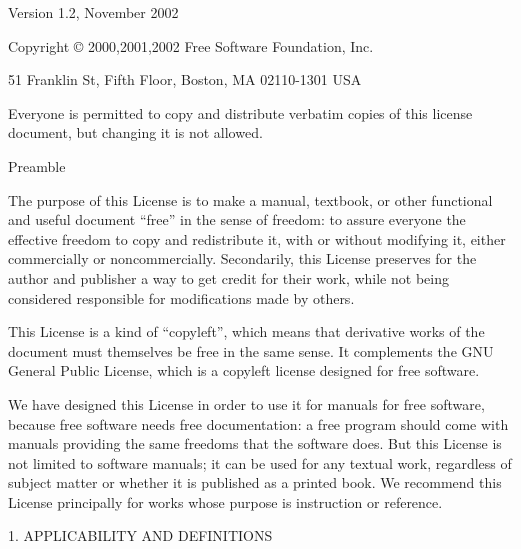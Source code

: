 \documentclass[10pt,a4paper,final]{book}
\begin{document}
{\small


 \begin{center}

       Version 1.2, November 2002


 Copyright \copyright{} 2000,2001,2002  Free Software Foundation, Inc.
 
 \bigskip
 
     51 Franklin St, Fifth Floor, Boston, MA  02110-1301  USA
  
 \bigskip
 
 Everyone is permitted to copy and distribute verbatim copies
 of this license document, but changing it is not allowed.
\end{center}


\begin{center}

{\Large Preamble\par}

\end{center}

The purpose of this License is to make a manual, textbook, or other
functional and useful document ``free'' in the sense of freedom: to
assure everyone the effective freedom to copy and redistribute it,
with or without modifying it, either commercially or noncommercially.
Secondarily, this License preserves for the author and publisher a way
to get credit for their work, while not being considered responsible
for modifications made by others.

This License is a kind of ``copyleft'', which means that derivative
works of the document must themselves be free in the same sense.  It
complements the GNU General Public License, which is a copyleft
license designed for free software.

We have designed this License in order to use it for manuals for free
software, because free software needs free documentation: a free
program should come with manuals providing the same freedoms that the
software does.  But this License is not limited to software manuals;
it can be used for any textual work, regardless of subject matter or
whether it is published as a printed book.  We recommend this License
principally for works whose purpose is instruction or reference.


\begin{center}
{\Large 1. APPLICABILITY AND DEFINITIONS\par}
\end{center}

}
\end{document}
